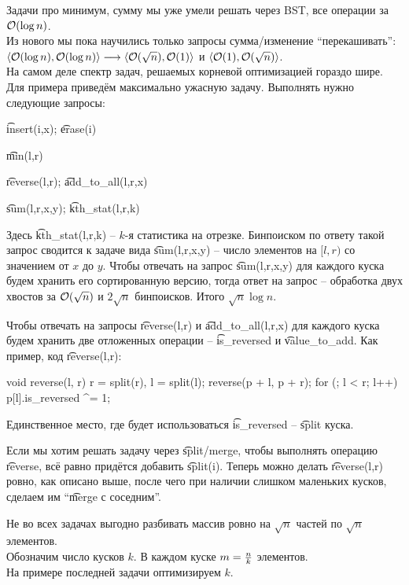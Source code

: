 
Задачи про минимум, сумму мы уже умели решать через BST, все операции за $\mathcal{O}(\log n)$.\\
Из нового мы пока научились только запросы сумма/изменение ``перекашивать'':\\
$\langle \mathcal{O}(\log n), \mathcal{O}(\log n) \rangle \longrightarrow \langle \mathcal{O}(\sqrt{n}), \mathcal{O}(1) \rangle$ и $\langle \mathcal{O}(1), \mathcal{O}(\sqrt{n}) \rangle$.\\
На самом деле спектр задач, решаемых корневой оптимизацией гораздо шире. Для примера приведём максимально ужасную задачу.
Выполнять нужно следующие запросы:
\begin{MyList}[0pt]
\item \t{insert(i,x)}; \t{erase(i)}
\item \t{min(l,r)}
\item \t{reverse(l,r)}; \t{add\_to\_all(l,r,x)}
\item \t{sum(l,r,x,y)}; \t{kth\_stat(l,r,k)}
\end{MyList}

Здесь \t{kth\_stat(l,r,k)} -- $k$-я статистика на отрезке. Бинпоиском по ответу такой
запрос сводится к задаче вида \t{sum(l,r,x,y)} -- число элементов на $[l,r)$ со значением от $x$ до $y$.
Чтобы отвечать на запрос \t{sum(l,r,x,y)} для каждого куска будем хранить его сортированную версию,
тогда ответ на запрос -- обработка двух хвостов за $\mathcal{O}(\sqrt{n})$ и $2\sqrt{n}$ бинпоисков. Итого $\sqrt{n}\log n$.

\down
Чтобы отвечать на запросы \t{reverse(l,r)} и \t{add\_to\_all(l,r,x)} для каждого куска будем хранить 
две отложенных операции -- \t{is\_reversed} и \t{value\_to\_add}. Как пример, код \t{reverse(l,r)}:
\begin{code}
void reverse(l, r) {
	r = split(r), l = split(l);
	reverse(p + l, p + r);
	for (; l < r; l++)
		p[l].is_reversed ^= 1;
}
\end{code}
Единственное место, где будет использоваться \t{is\_reversed} -- \t{split} куска.

\pagebreak
Если мы хотим решать задачу через \t{split/merge}, чтобы выполнять операцию \t{reverse},
всё равно придётся добавить \t{split(i)}. Теперь можно делать \t{reverse(l,r)} ровно, как описано выше,
после чего при наличии слишком маленьких кусков, сделаем им ``\t{merge} с соседним''.


Не во всех задачах выгодно разбивать массив ровно на $\sqrt{n}$ частей по $\sqrt{n}$ элементов.\\
Обозначим число кусков $k$. В каждом куске $m={\textstyle\frac{n}{k}}$ элементов.\\
На примере последней задачи оптимизируем $k$. 

